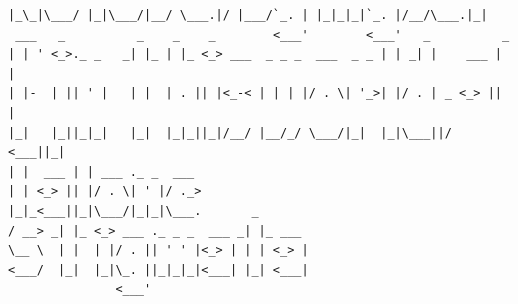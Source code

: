 \begin{verbatim}
|_\_|\___/ |_|\___/|__/ \___.|/ |___/`_. | |_|_|_|`_. |/__/\___.|_|    
 ___   _          _    _    _        <___'        <___'   _          _ 
| | ' <_>._ _   _| |_ | |_ <_> ___  _ _ _  ___  _ _ | | _| |    ___ | |
| |-  | || ' |   | |  | . || |<_-< | | | |/ . \| '_>| |/ . | _ <_> || |
|_|   |_||_|_|   |_|  |_|_||_|/__/ |__/_/ \___/|_|  |_|\___||/ <___||_|
| |  ___ | | ___ ._ _  ___                                             
| | <_> || |/ . \| ' |/ ._>                                            
|_|_<___||_|\___/|_|_|\___.       _                                    
/ __> _| |_ <_> ___ ._ _ _  ___ _| |_ ___                              
\__ \  | |  | |/ . || ' ' |<_> | | | <_> |                             
<___/  |_|  |_|\_. ||_|_|_|<___| |_| <___|                             
               <___'                                                                                                                                                                                                                                                                                                                                                                                                                                                                                                                                                                                                                                                                                                                                                            
\end{verbatim}